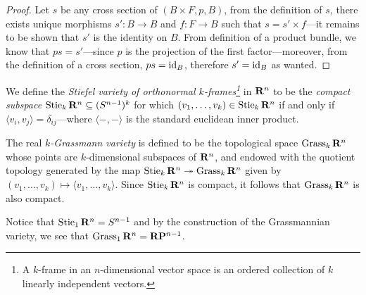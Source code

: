 \documentclass[../../../deep-dive]{subfile}
\begin{document}
\begin{proof}
Let \(s\) be any cross section of \((B \times F, p, B)\), from the definition of
\(s\), there exists unique morphisms \(s': B \to B\) and \(f: F \to B\) such
that \(s = s' \times f\)---it remains to be shown that \(s'\) is the identity on
\(B\). From definition of a product bundle, we know that \(p s = s'\)---since
\(p\) is the projection of the first factor---moreover, from the definition of a
cross section, \(p s = \operatorname{id}_B\), therefore \(s' = \operatorname{id}_B\) as wanted.
\end{proof}

\begin{definition}
\label{def:stiefel-variety}
We define the \emph{Stiefel variety of orthonormal \(k\)-frames\footnote{ A
    \(k\)-frame in an \(n\)-dimensional vector space is an ordered collection of
    \(k\) linearly independent vectors.  }} in \(\mathbf{R}^n\) to be the \emph{compact
  subspace} \(\operatorname{Stie}_k \mathbf{R}^n \subseteq (S^{n-1})^k\) for which
\((v_1, \dots, v_k) \in \operatorname{Stie}_k \mathbf{R}^n\) if and only if
\(\langle v_i, v_j \rangle = \delta_{ij}\)---where \(\langle -, - \rangle\) is
the standard euclidean inner product.
\end{definition}

\begin{definition}
\label{def:grassmann-variety}
The real \emph{\(k\)-Grassmann variety} is defined to be the topological space
\(\operatorname{Grass}_k \mathbf{R}^n\) whose points are \(k\)-dimensional subspaces of \(\mathbf{R}^n\), and
endowed with the quotient topology generated by the map
\(\operatorname{Stie}_k \mathbf{R}^n \twoheadrightarrow \operatorname{Grass}_k \mathbf{R}^n\) given by
\((v_1, \dots, v_k) \mapsto \langle v_1, \dots, v_k \rangle\). Since
\(\operatorname{Stie}_k \mathbf{R}^n\) is compact, it follows that \(\operatorname{Grass}_k \mathbf{R}^n\) is also compact.
\end{definition}

\begin{example}
\label{exp:grassmanian-projective-space}
Notice that \(\operatorname{Stie}_1 \mathbf{R}^n = S^{n-1}\) and by the construction of the
Grassmannian variety, we see that \(\operatorname{Grass}_1 \mathbf{R}^n = \mathbf{R} \mathbf{P}^{n-1}\).
\end{example}
\end{document}
